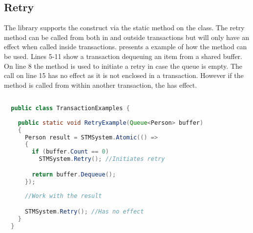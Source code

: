 \subsection{Retry}
The library supports the  construct via the static  method on the  class. The retry method can be called from both in and outside transactions but will only have an effect when called inside transactions.  presents a example of how the  method can be used. Lines 5-11 show a transaction dequeuing an item from a shared buffer. On line 8 the  method is used to initiate a retry in case the queue is empty. The call on line 15 has no effect as it is not enclosed in a transaction. However if the  method is called from within another transaction, the  has effect.

\begin{lstlisting}[label=lst:library_retry,
  caption={Library \bscode{Retry}},
  language=Java,  
  showspaces=false,
  showtabs=false,
  breaklines=true,
  showstringspaces=false,
  breakatwhitespace=true,
  commentstyle=\color{greencomments},
  keywordstyle=\color{bluekeywords},
  stringstyle=\color{redstrings},
  morekeywords={atomic, retry, orElse, var, get, set}]  % Start your code-block

  public class TransactionExamples {
    
    public static void RetryExample(Queue<Person> buffer)
    {
      Person result = STMSystem.Atomic(() =>
      {
        if (buffer.Count == 0)
          STMSystem.Retry(); //Initiates retry

        return buffer.Dequeue();
      });
      
      //Work with the result

      STMSystem.Retry(); //Has no effect
    }
  }
\end{lstlisting}
